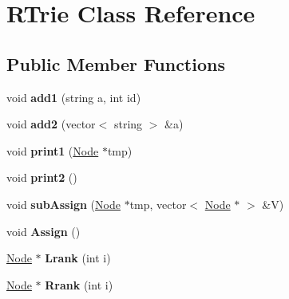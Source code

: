 \hypertarget{classRTrie}{
\section{RTrie Class Reference}
\label{classRTrie}
}
\subsection*{Public Member Functions}
\begin{DoxyCompactItemize}
\item 
\hypertarget{classRTrie_aa7c0a406fc5a752672dc83449f857f09}{
void {\bfseries add1} (string a, int id)}
\label{classRTrie_aa7c0a406fc5a752672dc83449f857f09}

\item 
\hypertarget{classRTrie_ab984c812b856f6d5e2c51559d1307c62}{
void {\bfseries add2} (vector$<$ string $>$ \&a)}
\label{classRTrie_ab984c812b856f6d5e2c51559d1307c62}

\item 
\hypertarget{classRTrie_a3d9ae374f75f0d0434c8fba72c00cf20}{
void {\bfseries print1} (\hyperlink{classNode}{Node} $\ast$tmp)}
\label{classRTrie_a3d9ae374f75f0d0434c8fba72c00cf20}

\item 
\hypertarget{classRTrie_ae218b7b092c3153ae0cf8b29f15d1ca8}{
void {\bfseries print2} ()}
\label{classRTrie_ae218b7b092c3153ae0cf8b29f15d1ca8}

\item 
\hypertarget{classRTrie_ad8742ccd5c638af89dca1da80539c5bf}{
void {\bfseries subAssign} (\hyperlink{classNode}{Node} $\ast$tmp, vector$<$ \hyperlink{classNode}{Node} $\ast$ $>$ \&V)}
\label{classRTrie_ad8742ccd5c638af89dca1da80539c5bf}

\item 
\hypertarget{classRTrie_ad655470a8c7225c15b9a313be8cfb41b}{
void {\bfseries Assign} ()}
\label{classRTrie_ad655470a8c7225c15b9a313be8cfb41b}

\item 
\hypertarget{classRTrie_ac717b1823c8d908b999760400b363127}{
\hyperlink{classNode}{Node} $\ast$ {\bfseries Lrank} (int i)}
\label{classRTrie_ac717b1823c8d908b999760400b363127}

\item 
\hypertarget{classRTrie_a1428640839fd681a4c76de159b7d6916}{
\hyperlink{classNode}{Node} $\ast$ {\bfseries Rrank} (int i)}
\label{classRTrie_a1428640839fd681a4c76de159b7d6916}

\end{DoxyCompactItemize}
